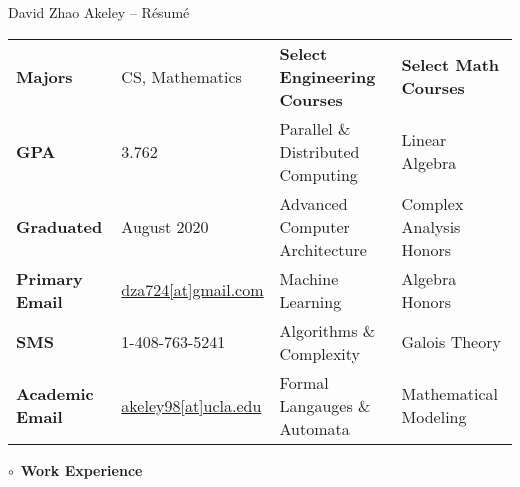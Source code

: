 \documentclass[11pt]{article}
\makeatletter
\newcommand{\email}[2]{{\small \color{webColor} \textsf{\href{mailto:#1@#2}{#1[at]#2}}}}
\newcommand{\myTitle}[1]{{ \vspace{2mm} \large \color{titleColor} \hspace{-12mm} \( \circ \)\ \textbf{\textsf{#1}} \vspace{2mm}}}
\newcommand{\myKey}[1]{{\color{keyColor}\textbf{#1}}}
\newcommand{\GPA}{3.762}
\makeatother
\begin{document}
\reversemarginpar
\begin{center}
\textsf{ \LARGE  \color{titleColor} David Zhao Akeley -- Résumé }


\end{center}

\begin{tabular}{l l|l l}
\myKey{Majors} & CS, Mathematics
 & \myKey{Select Engineering Courses} & \myKey{Select Math Courses} \\
\myKey{GPA} & \GPA & Parallel \& Distributed Computing & Linear Algebra \\
\myKey{Graduated} & August 2020
 & Advanced Computer Architecture & Complex Analysis Honors \\
\myKey{Primary Email} & \email{dza724}{gmail.com}
 & Machine Learning & Algebra Honors \\
\myKey{SMS} & 1-408-763-5241
 & Algorithms \& Complexity & Galois Theory \\
\myKey{Academic Email} & \email{akeley98}{ucla.edu}
 & Formal Langauges \& Automata & Mathematical Modeling
\end{tabular}

\vspace{0.1mm}

\myTitle{Work Experience}
\end{document}
